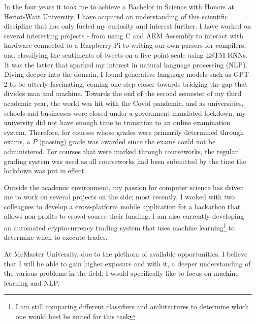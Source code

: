 \documentclass[a4paper,11pt]{article}
\newcommand{\uni}{McMaster University}
\newcommand{\hw}{Heriot-Watt University}
\begin{document}
In the four years it took me to achieve a Bachelor in Science with Honors at \hw, I have acquired an understanding of this scientific discipline that has only fueled my curiosity and interest further. I have worked on several interesting projects - from using C and ARM Assembly to interact with hardware connected to a Raspberry Pi to writing our own parsers for compilers, and classifying the sentiments of tweets on a five point scale using LSTM RNNs. It was the latter that sparked my interest in natural language processing (NLP). Diving deeper into the domain, I found generative language models such as GPT-2 to be utterly fascinating, coming one step closer towards bridging the gap that divides man and machine.
Towards the end of the second semester of my third academic year, the world was hit with the Covid pandemic, and as universities, schools and businesses were closed under a government-mandated lockdown, my university did not have enough time to transition to an online examination system. Therefore, for courses whose grades were primarily determined through exams, a $P$ (passing) grade was awarded since the exams could not be administered. For courses that were marked through courseworks, the regular grading system was used as all courseworks had been submitted by the time the lockdown was put in effect.

Outside the academic environment, my passion for computer science has driven me to work on several projects on the side; most recently, I worked with two colleagues to develop a cross-platform mobile application for a hackathon that allows non-profits to crowd-source their funding. I am also currently developing an automated cryptocurrency trading system that uses machine learning\footnote{I am still comparing different classifiers and architectures to determine which one would best be suited for this task} to determine when to execute trades. 

At \uni, due to the plethora of available opportunities, I believe that I will be able to gain higher exposure and with it, a deeper understanding of the various problems in the field. I would specifically like to focus on machine learning and NLP.

\printbibliography
\end{document}
